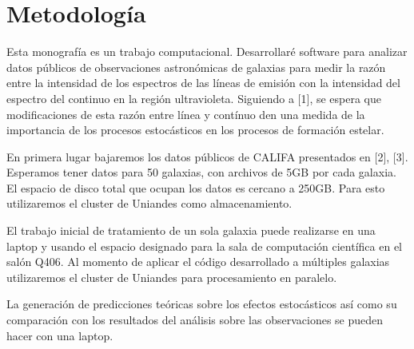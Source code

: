 \documentclass[12pt]{article}
\begin{document}
\section{Metodolog\'ia}



Esta monograf\'ia es un trabajo computacional. Desarrollar\'e software
para analizar datos p\'ublicos de observaciones astron\'omicas de
galaxias para medir la raz\'on entre la intensidad de los espectros de las
l\'ineas de emisi\'on con la intensidad del espectro del continuo en
la regi\'on ultravioleta.  Siguiendo a [1], se espera que
modificaciones de esta raz\'on entre l\'inea y cont\'inuo den una medida de la importancia de
 los procesos estoc\'asticos en los procesos de formaci\'on estelar.

En primera lugar bajaremos los datos p\'ublicos de CALIFA presentados
en [2], [3].
Esperamos tener datos para 50 galaxias, con archivos de 5GB por cada
galaxia.  El espacio de disco total que ocupan los datos es cercano a
250GB. Para esto utilizaremos el cluster de Uniandes como
almacenamiento. 

El trabajo inicial de tratamiento de un sola galaxia puede realizarse
en una laptop y usando el espacio designado para la sala de
computaci\'on cient\'ifica en el sal\'on Q406.
Al  momento de aplicar el c\'odigo desarrollado a m\'ultiples galaxias
utilizaremos el cluster de Uniandes para procesamiento en paralelo. 

La generaci\'on de predicciones te\'oricas sobre los efectos
estoc\'asticos as\'i como su comparaci\'on con los resultados del
an\'alisis sobre las observaciones se pueden hacer con una laptop. 


%
%


%
%
%
\end{document}
